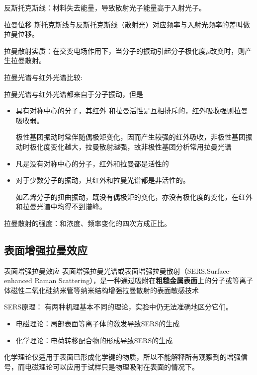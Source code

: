 反斯托克斯线：材料失去能量，导致散射光子能量高于入射光子。
\begin{definition*}{拉曼位移}
	斯托克斯线与反斯托克斯线（散射光）对应频率与入射光频率的差叫做拉曼位移。
\end{definition*}

拉曼散射实质：在交变电场作用下，当分子的振动引起分子极化度$\mu$改变时，则产生拉曼散射。

\begin{note}

	拉曼光谱与红外光谱比较:
	
	拉曼光谱与红外光谱都来自于分子振动，但是
	\begin{itemize}
		\item 具有对称中心的分子，其红外	和拉曼活性是互相排斥的，红外吸收强则拉曼吸收弱。         \begin{example}
			极性基团振动时常伴随偶极矩变化，因而产生较强的红外吸收，非极性基团振动时极化度变化越大，拉曼散射越强，故非极性基团分析常用拉曼光谱
		\end{example}
		\item 凡是没有对称中心的分子，红外和拉曼都是活性的
		\item 对于少数分子的振动，其红外和拉曼光谱都是非活性的。
		\begin{example}
			如乙烯分子的扭曲振动，既没有偶极矩的变化，亦没有极化度的变化，在红外和拉曼光谱中均得不到谱峰。
		\end{example}
	\end{itemize}

\end{note}

拉曼散射的强度：和浓度、频率变化的四次方成正比。

\subsection{表面增强拉曼效应}
\begin{definition*}{表面增强拉曼效应}
	表面增强拉曼光谱或表面增强拉曼散射（SERS,Surface-enhanced Raman Scattering），是一种通过吸附在\textbf{粗糙金属表面}上的分子或等离子体磁性二氧化硅纳米管等纳米结构增强拉曼散射的表面敏感技术
\end{definition*}

SERS原理：
有两种机理基本不同的理论，实验中仍无法准确地区分它们。
\begin{itemize}
	\item 电磁理论：局部表面等离子体的激发导致SERS的生成
	\item 化学理论：电荷转移配合物的形成导致SERS的生成
\end{itemize}
\begin{note}
	化学理论仅适用于表面已形成化学键的物质，所以不能解释所有观察到的增强信号，而电磁理论可以应用于试样只是物理吸附在表面的情况下。
\end{note}

